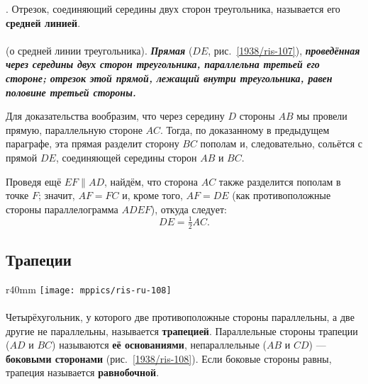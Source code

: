 {\small
\smallskip
\mbox{.}
Отрезок, соединяющий середины двух сторон треугольника, называется его \textbf{средней линией}.

}

\paragraph{}\label{1938/97}
 (о средней линии треугольника).
\textbf{\emph{Прямая}} ($DE$, рис.~\ref{1938/ris-107}), \textbf{\emph{проведённая через середины двух сторон треугольника, параллельна третьей его стороне;
отрезок этой прямой, лежащий внутри треугольника, равен половине третьей стороны.}}

Для доказательства вообразим, что через середину $D$ стороны $AB$ мы провели прямую, параллельную стороне $AC$.
Тогда, по доказанному в предыдущем параграфе, эта прямая разделит сторону $BC$ пополам и, следовательно, сольётся с прямой $DE$, соединяющей середины сторон $AB$ и $BC$.

Проведя ещё $EF \parallel AD$, найдём, что сторона $AC$ также разделится пополам в точке $F$;
значит, $AF=FC$ и, кроме того, $AF=DE$
(как противоположные стороны параллелограмма $ADEF$), откуда следует:
\[DE=\tfrac12AC.\]

\renewcommand{\bottomtitlespace}{.11\textheight}%

\subsection*{Трапеции}

\begin{wrapfigure}{r}{40mm}
\vskip-6mm
\centering
\texttt{[image: mppics/ris-ru-108]}
\caption{}\label{1938/ris-108}
\end{wrapfigure}

\paragraph{}\label{1938/98}
Четырёхугольник, у которого две противоположные стороны параллельны, а две другие не параллельны, называется \textbf{трапецией}.
Параллельные стороны трапеции ($AD$ и $BC$) называются \textbf{её основаниями}, непараллельные ($AB$ и $CD$) — \textbf{боковыми сторонами} (рис.~\ref{1938/ris-108}).
Если боковые стороны равны, трапеция называется \textbf{равнобочной}.

